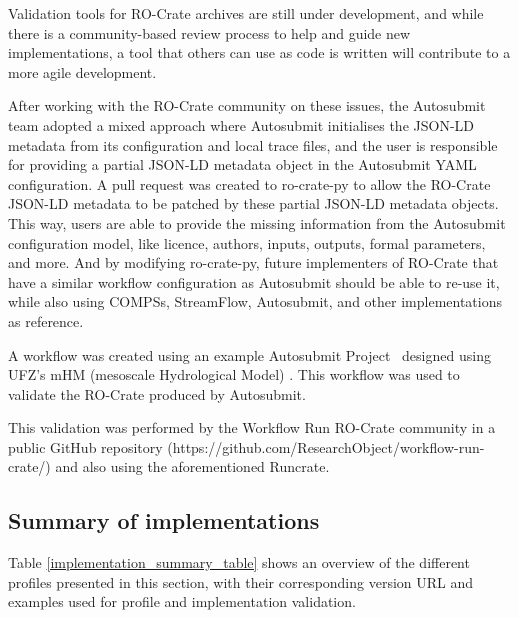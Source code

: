 \documentclass[10pt,letterpaper]{article}
\begin{document}
Validation tools for RO-Crate archives are still under development, and while there is a community-based review process to help and guide new implementations, a tool that others can use as code is written will contribute to a more agile development.

After working with the RO-Crate community on these issues, the Autosubmit team adopted a mixed approach where Autosubmit initialises the JSON-LD metadata from its configuration and local trace files, and the user is responsible for providing a partial JSON-LD metadata object in the Autosubmit YAML configuration.
A pull request was created to ro-crate-py to allow the RO-Crate JSON-LD metadata to be patched by these partial JSON-LD metadata objects.
This way, users are able to provide the missing information from the Autosubmit configuration model, like licence, authors, inputs, outputs, formal parameters, and more.
And by modifying ro-crate-py, future implementers of RO-Crate that have a similar workflow configuration as Autosubmit should be able to re-use it, while also using COMPSs, StreamFlow, Autosubmit, and other implementations as reference.

A workflow was created using an example Autosubmit Project~\cite{Kinoshita 2023} designed using UFZ's mHM (mesoscale Hydrological Model)
\cite{Samaniego 2010,Kumar 2013}. This workflow was used to validate the RO-Crate produced by Autosubmit.

This validation was performed by the Workflow Run RO-Crate community in a public GitHub repository (https://github.com/ResearchObject/workflow-run-crate/) and also using the aforementioned Runcrate.


\subsection{Summary of implementations}

Table \ref{implementation_summary_table} shows an overview of the different profiles presented in this section, with their corresponding version URL and examples used for profile and implementation validation.
\end{document}
